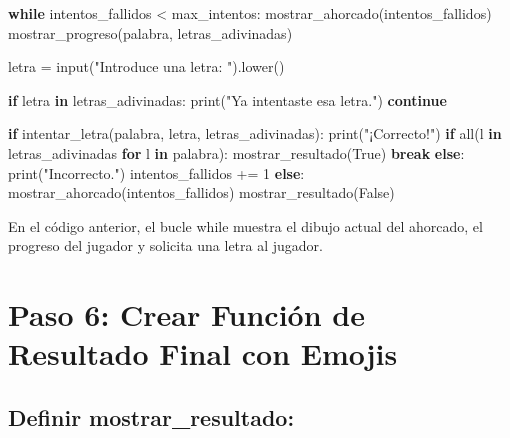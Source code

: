 \documentclass[
  a4paper,
  DIV=11,
  numbers=noendperiod,
  onepage,
  openany]{scrreprt}
\newenvironment{Shaded}{\begin{snugshade}}{\end{snugshade}}
\newcommand{\BuiltInTok}[1]{\textcolor[rgb]{0.00,0.23,0.31}{#1}}
\newcommand{\ControlFlowTok}[1]{\textcolor[rgb]{0.00,0.23,0.31}{\textbf{#1}}}
\newcommand{\DecValTok}[1]{\textcolor[rgb]{0.68,0.00,0.00}{#1}}
\newcommand{\KeywordTok}[1]{\textcolor[rgb]{0.00,0.23,0.31}{\textbf{#1}}}
\newcommand{\NormalTok}[1]{\textcolor[rgb]{0.00,0.23,0.31}{#1}}
\newcommand{\OperatorTok}[1]{\textcolor[rgb]{0.37,0.37,0.37}{#1}}
\newcommand{\StringTok}[1]{\textcolor[rgb]{0.13,0.47,0.30}{#1}}
\newcommand{\VariableTok}[1]{\textcolor[rgb]{0.07,0.07,0.07}{#1}}
\begin{document}
\begin{Shaded}
\begin{Highlighting}[]
    \ControlFlowTok{while}\NormalTok{ intentos\_fallidos }\OperatorTok{\textless{}}\NormalTok{ max\_intentos:}
\NormalTok{        mostrar\_ahorcado(intentos\_fallidos)}
\NormalTok{        mostrar\_progreso(palabra, letras\_adivinadas)}
        
\NormalTok{        letra }\OperatorTok{=} \BuiltInTok{input}\NormalTok{(}\StringTok{"Introduce una letra: "}\NormalTok{).lower()}
        
        \ControlFlowTok{if}\NormalTok{ letra }\KeywordTok{in}\NormalTok{ letras\_adivinadas:}
            \BuiltInTok{print}\NormalTok{(}\StringTok{"Ya intentaste esa letra."}\NormalTok{)}
            \ControlFlowTok{continue}
        
        \ControlFlowTok{if}\NormalTok{ intentar\_letra(palabra, letra, letras\_adivinadas):}
            \BuiltInTok{print}\NormalTok{(}\StringTok{"¡Correcto!"}\NormalTok{)}
            \ControlFlowTok{if} \BuiltInTok{all}\NormalTok{(l }\KeywordTok{in}\NormalTok{ letras\_adivinadas }\ControlFlowTok{for}\NormalTok{ l }\KeywordTok{in}\NormalTok{ palabra):}
\NormalTok{                mostrar\_resultado(}\VariableTok{True}\NormalTok{)}
                \ControlFlowTok{break}
        \ControlFlowTok{else}\NormalTok{:}
            \BuiltInTok{print}\NormalTok{(}\StringTok{"Incorrecto."}\NormalTok{)}
\NormalTok{            intentos\_fallidos }\OperatorTok{+=} \DecValTok{1}
    \ControlFlowTok{else}\NormalTok{:}
\NormalTok{        mostrar\_ahorcado(intentos\_fallidos)}
\NormalTok{        mostrar\_resultado(}\VariableTok{False}\NormalTok{)}
\end{Highlighting}
\end{Shaded}

En el código anterior, el bucle while muestra el dibujo actual del
ahorcado, el progreso del jugador y solicita una letra al jugador.

\section{Paso 6: Crear Función de Resultado Final con
Emojis}\label{paso-6-crear-funciuxf3n-de-resultado-final-con-emojis}

\subsection{Definir
mostrar\_resultado:}\label{definir-mostrar_resultado}
\end{document}
